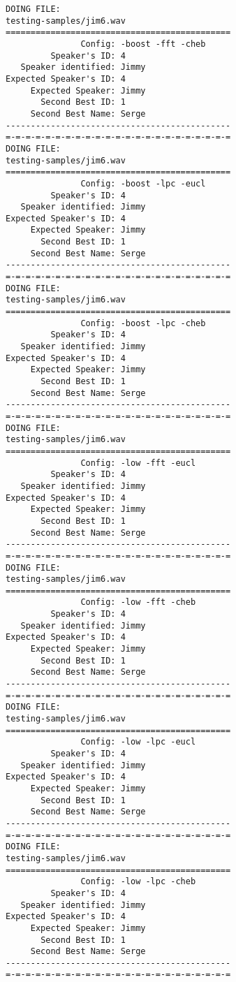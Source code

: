 \begin{verbatim}
DOING FILE:
testing-samples/jim6.wav
=============================================
               Config: -boost -fft -cheb
         Speaker's ID: 4
   Speaker identified: Jimmy
Expected Speaker's ID: 4
     Expected Speaker: Jimmy
       Second Best ID: 1
     Second Best Name: Serge
---------------------------------------------
=-=-=-=-=-=-=-=-=-=-=-=-=-=-=-=-=-=-=-=-=-=-=
DOING FILE:
testing-samples/jim6.wav
=============================================
               Config: -boost -lpc -eucl
         Speaker's ID: 4
   Speaker identified: Jimmy
Expected Speaker's ID: 4
     Expected Speaker: Jimmy
       Second Best ID: 1
     Second Best Name: Serge
---------------------------------------------
=-=-=-=-=-=-=-=-=-=-=-=-=-=-=-=-=-=-=-=-=-=-=
DOING FILE:
testing-samples/jim6.wav
=============================================
               Config: -boost -lpc -cheb
         Speaker's ID: 4
   Speaker identified: Jimmy
Expected Speaker's ID: 4
     Expected Speaker: Jimmy
       Second Best ID: 1
     Second Best Name: Serge
---------------------------------------------
=-=-=-=-=-=-=-=-=-=-=-=-=-=-=-=-=-=-=-=-=-=-=
DOING FILE:
testing-samples/jim6.wav
=============================================
               Config: -low -fft -eucl
         Speaker's ID: 4
   Speaker identified: Jimmy
Expected Speaker's ID: 4
     Expected Speaker: Jimmy
       Second Best ID: 1
     Second Best Name: Serge
---------------------------------------------
=-=-=-=-=-=-=-=-=-=-=-=-=-=-=-=-=-=-=-=-=-=-=
DOING FILE:
testing-samples/jim6.wav
=============================================
               Config: -low -fft -cheb
         Speaker's ID: 4
   Speaker identified: Jimmy
Expected Speaker's ID: 4
     Expected Speaker: Jimmy
       Second Best ID: 1
     Second Best Name: Serge
---------------------------------------------
=-=-=-=-=-=-=-=-=-=-=-=-=-=-=-=-=-=-=-=-=-=-=
DOING FILE:
testing-samples/jim6.wav
=============================================
               Config: -low -lpc -eucl
         Speaker's ID: 4
   Speaker identified: Jimmy
Expected Speaker's ID: 4
     Expected Speaker: Jimmy
       Second Best ID: 1
     Second Best Name: Serge
---------------------------------------------
=-=-=-=-=-=-=-=-=-=-=-=-=-=-=-=-=-=-=-=-=-=-=
DOING FILE:
testing-samples/jim6.wav
=============================================
               Config: -low -lpc -cheb
         Speaker's ID: 4
   Speaker identified: Jimmy
Expected Speaker's ID: 4
     Expected Speaker: Jimmy
       Second Best ID: 1
     Second Best Name: Serge
---------------------------------------------
=-=-=-=-=-=-=-=-=-=-=-=-=-=-=-=-=-=-=-=-=-=-=

\end{verbatim}
